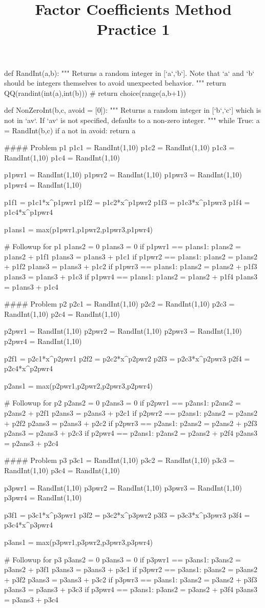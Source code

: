 \documentclass{ximera}
\title{Factor Coefficients Method Practice 1}
\begin{document}
\begin{sagesilent}
def RandInt(a,b):
    """ Returns a random integer in [`a`,`b`]. Note that `a` and `b` should be integers themselves to avoid unexpected behavior.
    """
    return QQ(randint(int(a),int(b)))
    # return choice(range(a,b+1))

def NonZeroInt(b,c, avoid = [0]):
    """ Returns a random integer in [`b`,`c`] which is not in `av`. 
        If `av` is not specified, defaults to a non-zero integer.
    """
    while True:
        a = RandInt(b,c)
        if a not in avoid:
            return a


#### Problem p1
p1c1 = RandInt(1,10)
p1c2 = RandInt(1,10)
p1c3 = RandInt(1,10)
p1c4 = RandInt(1,10)

p1pwr1 = RandInt(1,10)
p1pwr2 = RandInt(1,10)
p1pwr3 = RandInt(1,10)
p1pwr4 = RandInt(1,10)

p1f1 = p1c1*x^p1pwr1
p1f2 = p1c2*x^p1pwr2
p1f3 = p1c3*x^p1pwr3
p1f4 = p1c4*x^p1pwr4

p1ans1 = max(p1pwr1,p1pwr2,p1pwr3,p1pwr4)

# Followup for p1
p1ans2 = 0
p1ans3 = 0
if p1pwr1 == p1ans1:
    p1ans2 = p1ans2 + p1f1
    p1ans3 = p1ans3 + p1c1
if p1pwr2 == p1ans1:
    p1ans2 = p1ans2 + p1f2
    p1ans3 = p1ans3 + p1c2
if p1pwr3 == p1ans1:
    p1ans2 = p1ans2 + p1f3
    p1ans3 = p1ans3 + p1c3
if p1pwr4 == p1ans1:
    p1ans2 = p1ans2 + p1f4
    p1ans3 = p1ans3 + p1c4


#### Problem p2
p2c1 = RandInt(1,10)
p2c2 = RandInt(1,10)
p2c3 = RandInt(1,10)
p2c4 = RandInt(1,10)

p2pwr1 = RandInt(1,10)
p2pwr2 = RandInt(1,10)
p2pwr3 = RandInt(1,10)
p2pwr4 = RandInt(1,10)

p2f1 = p2c1*x^p2pwr1
p2f2 = p2c2*x^p2pwr2
p2f3 = p2c3*x^p2pwr3
p2f4 = p2c4*x^p2pwr4

p2ans1 = max(p2pwr1,p2pwr2,p2pwr3,p2pwr4)

# Followup for p2
p2ans2 = 0
p2ans3 = 0
if p2pwr1 == p2ans1:
    p2ans2 = p2ans2 + p2f1
    p2ans3 = p2ans3 + p2c1
if p2pwr2 == p2ans1:
    p2ans2 = p2ans2 + p2f2
    p2ans3 = p2ans3 + p2c2
if p2pwr3 == p2ans1:
    p2ans2 = p2ans2 + p2f3
    p2ans3 = p2ans3 + p2c3
if p2pwr4 == p2ans1:
    p2ans2 = p2ans2 + p2f4
    p2ans3 = p2ans3 + p2c4

#### Problem p3
p3c1 = RandInt(1,10)
p3c2 = RandInt(1,10)
p3c3 = RandInt(1,10)
p3c4 = RandInt(1,10)

p3pwr1 = RandInt(1,10)
p3pwr2 = RandInt(1,10)
p3pwr3 = RandInt(1,10)
p3pwr4 = RandInt(1,10)

p3f1 = p3c1*x^p3pwr1
p3f2 = p3c2*x^p3pwr2
p3f3 = p3c3*x^p3pwr3
p3f4 = p3c4*x^p3pwr4

p3ans1 = max(p3pwr1,p3pwr2,p3pwr3,p3pwr4)

# Followup for p3
p3ans2 = 0
p3ans3 = 0
if p3pwr1 == p3ans1:
    p3ans2 = p3ans2 + p3f1
    p3ans3 = p3ans3 + p3c1
if p3pwr2 == p3ans1:
    p3ans2 = p3ans2 + p3f2
    p3ans3 = p3ans3 + p3c2
if p3pwr3 == p3ans1:
    p3ans2 = p3ans2 + p3f3
    p3ans3 = p3ans3 + p3c3
if p3pwr4 == p3ans1:
    p3ans2 = p3ans2 + p3f4
    p3ans3 = p3ans3 + p3c4




\end{sagesilent}
\end{document}
